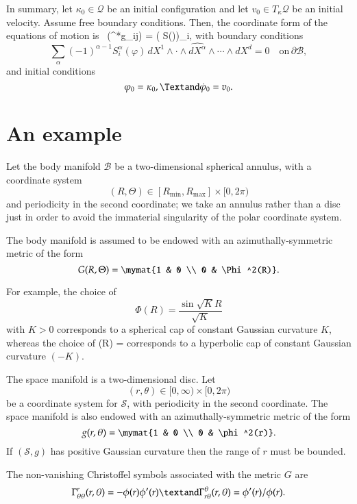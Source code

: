 \documentclass[smallextended]{svjour3}
\begin{document}
In summary, let $\kappa_0\in{\mathcal{Q}}$ be an initial configuration and let $v_0\in T_\kappa{\mathcal{Q}}$ be an initial velocity. 
Assume free boundary conditions. Then, the coordinate form of the equations of motion is 
\beq
\label{decase1}
\, ({\varphi}^*g_{ij})  =  ( S({\varphi}))_i,
\eeq
with boundary conditions
\[
\sum_\alpha(-1)^{\alpha-1}S^{\alpha}_i({\varphi}) \, dX^1\wedge\cdot\wedge \widehat{dX^\alpha}\wedge \cdots\wedge dX^d = 0 \quad \text{on} \,\partial{\mathcal{B}},
\]
and initial conditions
\[
{\varphi}_0=\kappa_0, \Textand  \dot{\varphi}_0 = v_0.
\]

\section{An example}
\label{sec:example}

Let the body manifold ${\mathcal{B}}$ be a two-dimensional spherical annulus, with a coordinate system
\[
(R,\Theta) \in [{R_{\text{min}}},{R_{\text{max}}}]\times [0,2\pi)
\]
and periodicity in the second coordinate; we take an annulus rather than a disc just in order to avoid the immaterial singularity of the polar coordinate system.

The body manifold is assumed to be endowed with an azimuthally-symmetric metric of the form
\[
G(R,\Theta) = \mymat{1 & 0 \\ 0 & \Phi^2(R)}.
\]

For example, the choice of 
\[
\Phi(R) = \frac{\sin\sqrt{K}R}{\sqrt{K}}
\]
with $K>0$ corresponds to a spherical cap of constant Gaussian curvature $K$, whereas the choice of 
\beq
\Phi(R) = 
\label{eq:sphere}
\eeq
corresponds to a hyperbolic cap of constant Gaussian curvature $(-K)$.

The space manifold is a two-dimensional disc. Let 
\[
(r,\theta) \in [0,\infty)\times [0,2\pi)
\]
be a coordinate system for ${\mathcal{S}}$, with periodicity in the second coordinate. 
The space manifold is also endowed with an azimuthally-symmetric metric of the form
\[
g(r,\theta) = \mymat{1 & 0 \\ 0 & \phi^2(r)}.
\]
If $({\mathcal{S}},g)$ has positive Gaussian curvature then the range of $r$ must be bounded.

The non-vanishing Christoffel symbols associated with the metric $G$ are 
\[
\Gamma^r_{\theta\theta}(r,\theta) = -\phi(r)\phi'(r)
\textand
\Gamma^\theta_{r\theta}(r,\theta) =  \phi'(r)/\phi(r).
\]
\end{document}
